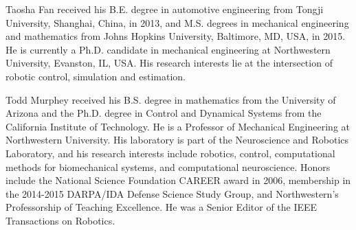\begin{IEEEbiography}{Taosha Fan}
received his B.E. degree in automotive engineering from Tongji University, Shanghai, China, in 2013, and M.S. degrees in mechanical engineering and mathematics from Johns Hopkins University, Baltimore, MD, USA, in 2015. He is currently a Ph.D. candidate in mechanical engineering at Northwestern University, Evanston, IL, USA. His research interests lie at the intersection of robotic control, simulation and estimation.
\end{IEEEbiography}

\begin{IEEEbiography}{Todd Murphey}
received his B.S. degree in mathematics from the University of Arizona and the Ph.D. degree in Control and Dynamical Systems from the California Institute of Technology.
He is a Professor of Mechanical Engineering at Northwestern University. His laboratory is part of the Neuroscience and Robotics Laboratory, and his research interests include robotics, control, computational methods for biomechanical systems, and computational neuroscience.
Honors include the National Science Foundation CAREER award in 2006, membership in the 2014-2015 DARPA/IDA Defense Science Study Group, and Northwestern’s Professorship of Teaching
Excellence. He was a Senior Editor of the IEEE Transactions on Robotics.
\end{IEEEbiography}